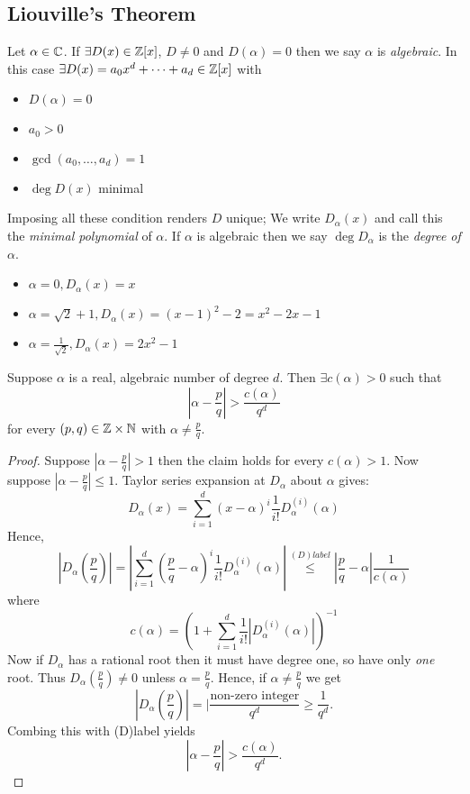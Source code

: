 \documentclass[NumTh.tex]{subfiles}
\begin{document}
\subsection{Liouville's Theorem}
Let $\alpha \in \mathbb{C}$. If $\exists D(x) \in \mathbb{Z}[x]$, $D \neq 0$ and $D(\alpha) = 0$ then we say $\alpha$ is \emph{algebraic}.
In this case $\exists D(x) = a_0 x^d + \dots + a_d \in \mathbb{Z}[x]$ with
\begin{itemize}
  \item $D(\alpha) = 0$
  \item $a_0 > 0$
  \item $\gcd(a_0,\dots,a_d) = 1$
  \item $\deg D(x)$ minimal
\end{itemize}
Imposing all these condition renders $D$ unique; We write $D_\alpha(x)$ and call this the \emph{minimal polynomial} of $\alpha$.
If $\alpha$ is algebraic then we say $\deg D_\alpha$ is the \emph{degree of $\alpha$}.

\begin{ex}
  \begin{itemize}
    \item $\alpha = 0, D_\alpha(x) = x$
    \item $\alpha = \sqrt{2} + 1, D_\alpha(x) = (x -1)^2 - 2 = x^2 -2x -1$
    \item $\alpha = \frac {1}{\sqrt{2}}, D_\alpha(x) = 2x^2 -1$
  \end{itemize}
\end{ex}

\begin{theorem}\label{1_3_1}
  Suppose $\alpha$ is a real, algebraic number of degree $d$.
  Then $\exists c(\alpha) > 0$ such that
  \[ |\alpha - \frac{p}{q}| > \frac{c(\alpha)}{q^d} \]
  for every $(p,q) \in \mathbb{Z} \times \mathbb{N}$ with $\alpha \neq \frac{p}{q}$.
\end{theorem}

\begin{proof}
  Suppose $|\alpha - \frac{p}{q} | > 1$ then the claim holds for every $c(\alpha) > 1$.
  Now suppose $|\alpha - \frac{p}{q}| \leq 1$. Taylor series expansion at $D_\alpha$ about $\alpha$ gives:
  \[ D_\alpha(x) = \sum_{i=1}^d (x - \alpha)^i \frac{1}{i!} D_\alpha^{(i)}(\alpha) \]
  Hence, 
  \[ |D_\alpha\left(\frac{p}{q}\right) | = | \sum_{i=1}^d \left(\frac{p}{q} - \alpha \right)^i \frac{1}{i!} D_\alpha^{(i)}(\alpha)| \overset{(D)label}{\leq} |\frac{p}{q} - \alpha | \frac{1}{c(\alpha)} \]
  where
  \[ c(\alpha) = \left( 1 + \sum_{i=1}^d \frac{1}{i!} |D_\alpha^{(i)}(\alpha) |\right)^{-1} \]
  Now if $D_\alpha$ has a rational root then it must have degree one, so have only \emph{one} root.
  Thus $D_\alpha \left(\frac{p}{q}\right) \neq 0$ unless $\alpha = \frac{p}{q}$.
  Hence, if $\alpha \neq \frac{p}{q}$ we get
  \[ | D_\alpha \left(\frac{p}{q}\right) | = | \frac{\text{non-zero integer}}{q^d} \geq \frac{1}{q^d}. \]
  Combing this with (D)label yields 
  \[ |\alpha - \frac{p}{q} | > \frac{c(\alpha)}{q^d}.\]
\end{proof}
\end{document}

